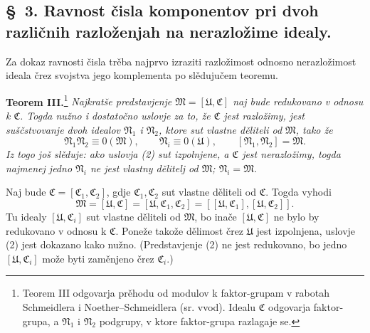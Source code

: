 \documentclass[11pt]{article}
\newcommand{\ideal}[1]{\mathfrak{#1}}
\begin{document}

\setcounter{footnote}{12}
\subsection*{\S~3. Ravnost čisla komponentov pri dvoh različnih razloženjah na nerazložime idealy.}

Za dokaz ravnosti čisla trěba najprvo izraziti razložimost odnosno nerazložimost ideala črez svojstva jego komplementa po slědujučem teoremu.

\textbf{Teorem III.}\footnote{Teorem III odgovarja prěhodu od modulov k faktor-grupam v rabotah Schmeidlera i Noether--Schmeidlera (sr. vvod). Idealu \(\ideal C\) odgovarja faktor-grupa, a \(\ideal N_1\) i \(\ideal N_2\) podgrupy, v ktore faktor-grupa razlagaje se.} \emph{Najkratše predstavjenje \(\ideal M=[\ideal U,\ideal C]\) naj bude redukovano v odnosu k \(\ideal C\). Togda nužno i dostatočno uslovje za to, že \(\ideal C\) jest razložimy, jest suščstvovanje dvoh idealov \(\ideal N_1\) i \(\ideal N_2\), ktore sut vlastne děliteli od \(\ideal M\), tako že}
\begin{equation}
 \ideal N_1\ideal N_2\equiv0(\ideal M),\qquad
 \ideal N_i\equiv0(\ideal U),\qquad
 [\ideal N_1,\ideal N_2]=\ideal M.
\tag{2}
\end{equation}
\emph{Iz togo još slěduje: ako uslovja (2) sut izpolnjene, a \(\ideal C\) jest nerazložimy, togda najmenej jedno \(\ideal N_i\) ne jest vlastny dělitelj od \(\ideal M\); \(\ideal N_i=\ideal M\).}

Naj bude \(\ideal C=[\ideal C_1,\ideal C_2]\), gdje \(\ideal C_1,\ideal C_2\) sut vlastne děliteli od \(\ideal C\). Togda vyhodi
\[
 \ideal M=[\ideal U,\ideal C]=[\ideal U,\ideal C_1,\ideal C_2]
       =[[\ideal U,\ideal C_1],[\ideal U,\ideal C_2]].
\]
Tu idealy \([\ideal U,\ideal C_i]\) sut vlastne děliteli od \(\ideal M\), bo inače \([\ideal U,\ideal C]\) ne bylo by redukovano v odnosu k \(\ideal C\). Poneže takože dělimost črez \(\ideal U\) jest izpolnjena, uslovje (2) jest dokazano kako nužno. (Predstavjenje (2) ne jest redukovano, bo jedno \([\ideal U,\ideal C_i]\) može byti zaměnjeno črez \(\ideal C_i\).)
\end{document}

